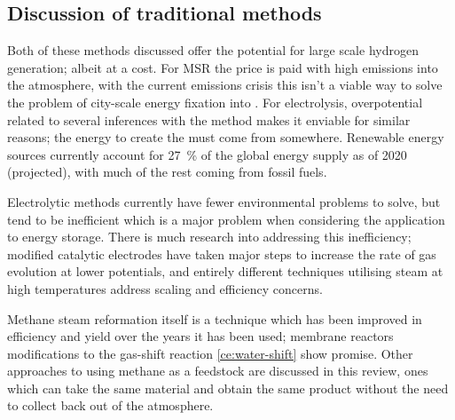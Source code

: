 \subsection{Discussion of traditional methods}%
\label{sub:discussion_of_traditional_methods}
Both of these methods discussed offer the potential for large scale hydrogen generation; albeit at a cost.
For MSR the price is paid with high emissions into the atmosphere, with the current  emissions crisis this isn't a viable way to solve the problem of city-scale energy fixation into .
For electrolysis, overpotential related to several inferences with the method makes it enviable for similar reasons; the energy to create the  must come from somewhere.
Renewable energy sources currently account for \SI{27}{\percent} of the global energy supply as of 2020\cite{IEA2020} (projected), with much of the rest coming from fossil fuels.

Electrolytic methods currently have fewer environmental problems to solve, but tend to be inefficient which is a major problem when considering the application to energy storage.
There is much research into addressing this inefficiency; modified catalytic electrodes have taken major steps to increase the rate of gas evolution at lower potentials, and entirely different techniques utilising steam at high temperatures address scaling and efficiency concerns.

Methane steam reformation itself is a technique which has been improved in efficiency and yield over the years it has been used; membrane reactors \cite{} modifications to the gas-shift reaction \eqref{ce:water-shift}\cite{Saxena2011} show promise.
Other approaches to using methane as a feedstock are discussed in this review, ones which can take the same material and obtain the same product without the need to collect  back out of the atmosphere.
